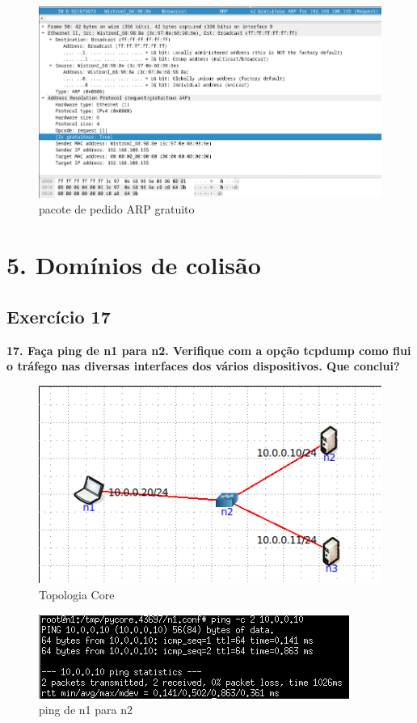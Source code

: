 \documentclass[a4paper]{report}
\begin{document}
\begin{figure}[H]
    \centering 
    \includegraphics[width=\textwidth]{images/ex16.png}
    \caption{pacote de pedido ARP gratuito}
    \label{fig:ex16}
\end{figure}


\chapter{5. Domínios de colisão}
\section{Exercício 17}
\textbf{17. Faça ping de n1 para n2. Verifique com a opção tcpdump como flui o
tráfego nas diversas interfaces dos vários dispositivos. Que conclui?}
\begin{figure}[H]
    \centering 
    \includegraphics[width=\textwidth]{images/ex17topologiacore.png}
    \caption{Topologia Core}
    \label{fig:ex17topologiacore}
\end{figure}

\begin{figure}[H]
    \centering 
    \includegraphics[width=\textwidth]{images/ex17ping.png}
    \caption{ping de n1 para n2}
    \label{fig:ex17ping}
\end{figure}
\end{document}
